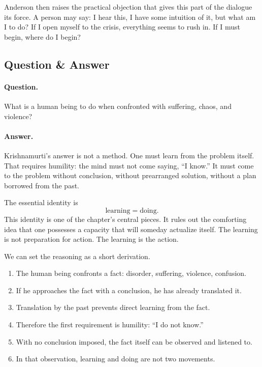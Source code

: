 Anderson then raises the practical objection that gives this part of the dialogue its force. A person may say: I hear this, I have some intuition of it, but what am I to do? If I open myself to the crisis, everything seems to rush in. If I must begin, where do I begin?

\subsection{Question \& Answer}

\paragraph{Question.}
What is a human being to do when confronted with suffering, chaos, and violence?

\paragraph{Answer.}
Krishnamurti's answer is not a method. One must learn from the problem itself. That requires humility: the mind must not come saying, ``I know.'' It must come to the problem without conclusion, without prearranged solution, without a plan borrowed from the past.

The essential identity is
\begin{equation}
\text{learning} = \text{doing}.
\end{equation}
This identity is one of the chapter's central pieces. It rules out the comforting idea that one possesses a capacity that will someday actualize itself. The learning is not preparation for action. The learning is the action.

We can set the reasoning as a short derivation.

\begin{enumerate}
\item The human being confronts a fact: disorder, suffering, violence, confusion.
\item If he approaches the fact with a conclusion, he has already translated it.
\item Translation by the past prevents direct learning from the fact.
\item Therefore the first requirement is humility: ``I do not know.''
\item With no conclusion imposed, the fact itself can be observed and listened to.
\item In that observation, learning and doing are not two movements.
\end{enumerate}

